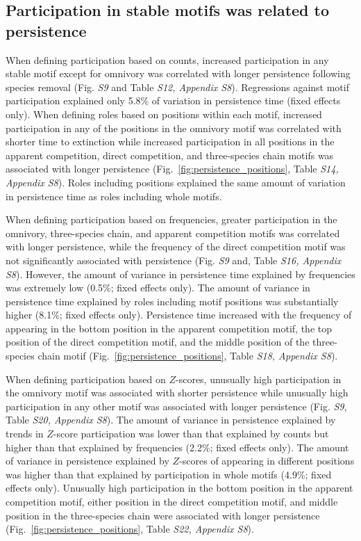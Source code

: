 \documentclass[12pt]{article}
\begin{document}
\begin{spacing}{2.0}
    \subsection*{Participation in stable motifs was related to persistence}
    
        When defining participation based on counts, increased participation in any stable motif except for omnivory was correlated with longer persistence following species removal (Fig. \emph{S9} and Table \emph{S12, Appendix S8}).
        Regressions against motif participation explained only 5.8\% of variation in persistence time (fixed effects only).
        When defining roles based on positions within each motif,  increased participation in any of the positions in the omnivory motif was correlated with shorter time to extinction while increased participation in all positions in the apparent competition, direct competition, and three-species chain motifs was associated with longer persistence (Fig.~\ref{fig:persistence_positions}, Table \emph{S14, Appendix S8}).
        Roles including positions explained the same amount of variation in persistence time as roles including whole motifs.
        
        
        When defining participation based on frequencies, greater participation in the omnivory, three-species chain, and apparent competition motifs was correlated with longer persistence, while the frequency of the direct competition motif was not significantly associated with persistence (Fig. \emph{S9} and, Table \emph{S16, Appendix S8}).
        However, the amount of variance in persistence time explained by frequencies was extremely low (0.5\%; fixed effects only). 
        The amount of variance in persistence time explained by roles including motif positions was substantially higher (8.1\%; fixed effects only).
        Persistence time increased with the frequency of appearing in the bottom position in the apparent competition motif, the top position of the direct competition motif, and the middle position of the three-species chain motif (Fig.~\ref{fig:persistence_positions}, Table \emph{S18, Appendix S8}).

        
        When defining participation based on $Z$-scores, unusually high participation in the omnivory motif was associated with shorter persistence while unusually high participation in any other motif was associated with longer persistence (Fig. \emph{S9}, Table \emph{S20, Appendix S8}).
        The amount of variance in persistence explained by trends in $Z$-score participation was lower than that explained by counts but higher than that explained by frequencies (2.2\%; fixed effects only).
        The amount of variance in persistence explained by $Z$-scores of appearing in different positions was higher than that explained by participation in whole motifs (4.9\%; fixed effects only).
        Unusually high participation in the bottom position in the apparent competition motif, either position in the direct competition motif, and middle position in the three-species chain were associated with longer persistence (Fig.~\ref{fig:persistence_positions}, Table \emph{S22, Appendix S8}).



\end{spacing}
\end{document}
